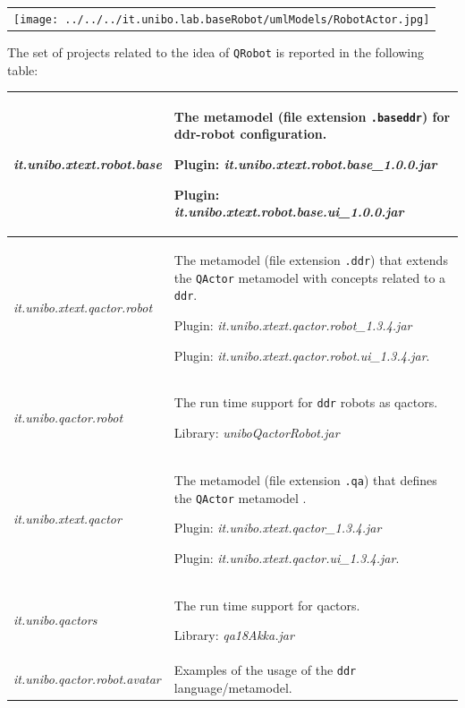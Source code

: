  
\begin{center}
\begin{tabular}{ c }
    \texttt{[image: ../../../it.unibo.lab.baseRobot/umlModels/RobotActor.jpg]}\\
\end{tabular} 
\end{center}


\medskip 
The set of projects related to the idea of \texttt{QRobot} is reported in the following table:

\noindent
\begin{tabular}{|p{}|p{}|}
\hline 
\textit{it.unibo.xtext.robot.base} 
&The metamodel (file extension \texttt{.baseddr})  for ddr-robot configuration.

\medskip 
Plugin: \textit{it.unibo.xtext.robot.base\_1.0.0.jar} 

Plugin: \textit{it.unibo.xtext.robot.base.ui\_1.0.0.jar}
\\ 
\hline 
\textit{it.unibo.xtext.qactor.robot} 
&The metamodel (file extension \texttt{.ddr}) that extends the \texttt{QActor} metamodel with concepts related to a \texttt{ddr}.

\medskip 
Plugin: \textit{it.unibo.xtext.qactor.robot\_1.3.4.jar}

Plugin: \textit{it.unibo.xtext.qactor.robot.ui\_1.3.4.jar}.
\\ 
\hline 
\textit{it.unibo.qactor.robot} 
&The run time support for \texttt{ddr} robots as qactors.

\medskip 
Library: \textit{uniboQactorRobot.jar}
\\
\hline 
\textit{it.unibo.xtext.qactor} 
&The metamodel (file extension \texttt{.qa}) that defines the \texttt{QActor} metamodel .

\medskip 
Plugin: \textit{it.unibo.xtext.qactor\_1.3.4.jar}

Plugin: \textit{it.unibo.xtext.qactor.ui\_1.3.4.jar}.
\\ 
\hline 
\textit{it.unibo.qactors} 
&The run time support for  qactors.

\medskip 
Library: \textit{qa18Akka.jar}
\\
\hline 
\textit{it.unibo.qactor.robot.avatar} 
&Examples of the usage of the \texttt{ddr} language/metamodel.
\\ 
\hline 
\end{tabular} 
 
